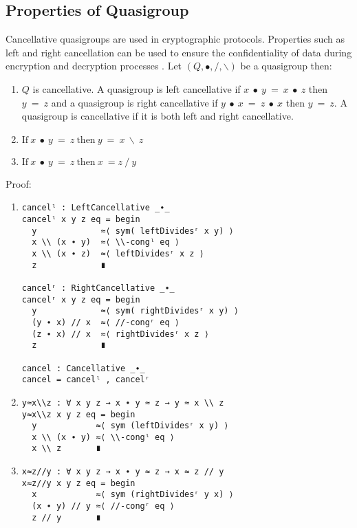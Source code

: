 \subsection{Properties of Quasigroup}
Cancellative quasigroups are used in cryptographic protocols. Properties such as
left and right cancellation can be used to ensure the confidentiality of data
during encryption and decryption processes \cite{shcherbacov2003elements}. Let
$(Q, ∙, /, \backslash)$ be a quasigroup then:
\begin{enumerate}
\item $Q$ is cancellative. A quasigroup is left cancellative if $x\ ∙\ y\ =\ x\ ∙\ z$ then
$y\ =\ z$ and a quasigroup is right cancellative if $y\ ∙\ x\ =\ z\ ∙\ x$ then $y\ =\ z$. A
quasigroup is cancellative if it is both left and right cancellative.
\item \(\text{If} \ x\ ∙\ y\ =\ z\ \text{then}\ y\ =\ x\ \backslash \ z\)
\item \(\text{If} \ x\ ∙\ y\ =\ z\ \text{then}\ x\ = z\ /\ y\)
\end{enumerate}
Proof:
\begin{enumerate}
\item 
\begin{verbatim}
cancelˡ : LeftCancellative _∙_
cancelˡ x y z eq = begin
  y             ≈⟨ sym( leftDividesʳ x y) ⟩
  x \\ (x ∙ y)  ≈⟨ \\-congˡ eq ⟩
  x \\ (x ∙ z)  ≈⟨ leftDividesʳ x z ⟩
  z             ∎

cancelʳ : RightCancellative _∙_
cancelʳ x y z eq = begin
  y             ≈⟨ sym( rightDividesʳ x y) ⟩
  (y ∙ x) // x  ≈⟨ //-congʳ eq ⟩
  (z ∙ x) // x  ≈⟨ rightDividesʳ x z ⟩
  z             ∎

cancel : Cancellative _∙_
cancel = cancelˡ , cancelʳ
\end{verbatim}

\item 
\begin{verbatim}
y≈x\\z : ∀ x y z → x ∙ y ≈ z → y ≈ x \\ z
y≈x\\z x y z eq = begin
  y            ≈⟨ sym (leftDividesʳ x y) ⟩
  x \\ (x ∙ y) ≈⟨ \\-congˡ eq ⟩
  x \\ z       ∎
\end{verbatim}

\item 
\begin{verbatim}
x≈z//y : ∀ x y z → x ∙ y ≈ z → x ≈ z // y
x≈z//y x y z eq = begin
  x            ≈⟨ sym (rightDividesʳ y x) ⟩
  (x ∙ y) // y ≈⟨ //-congʳ eq ⟩
  z // y       ∎
\end{verbatim}
\end{enumerate}

